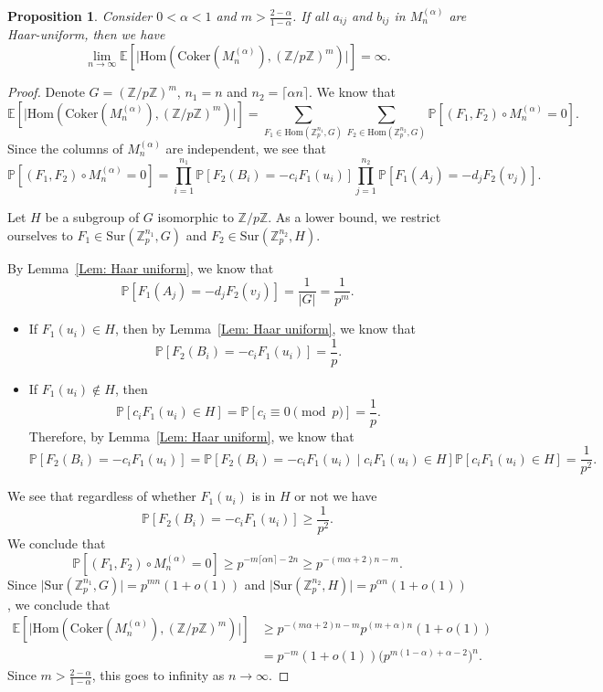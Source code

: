 \documentclass[12pt]{amsart}
\newtheorem{proposition}[theorem]{Proposition}
\theoremstyle{definition}
\newcommand{\PPP}{\mathbb{P}}
\newcommand{\Mna}{M_{n}^{(\alpha)}}
\newcommand{\abs}[1]{\vert#1\vert}
\newcommand{\Zp}{\Z_p}
\newcommand{\E}{\mathbb{E}}
\newcommand{\Z}{\mathbb{Z}}
\newcommand{\Coker}{\text{Coker}}
\newcommand{\Hom}{\text{Hom}}
\newcommand{\Sur}{\text{Sur}}
\newcommand{\ceil}[1]{\lceil#1\rceil}
\begin{document}
\begin{proposition}
Consider $0<\alpha<1$ and $m>\frac{2-\alpha}{1-\alpha}$.
If all $a_{ij}$ and $b_{ij}$ in $\Mna$ are Haar-uniform, then we have
\[
\lim_{n\to\infty} 
\E[\abs{\Hom(\Coker(\Mna),(\Z/p\Z)^m)}]
=\infty.
\]
\end{proposition}
\begin{proof}
Denote $G=(\Z/p\Z)^m$, $n_1=n$ and $n_2=\ceil{\alpha n}$. We know that
\[
\E[\abs{\Hom(\Coker(\Mna),(\Z/p\Z)^m)}]
=\sum_{F_1\in\Hom(\Zp^{n_1},G)}
\sum_{F_2\in\Hom(\Zp^{n_2},G)}
\PPP[(F_1,F_2)\circ \Mna =0].
\]
Since the columns of $\Mna$ are independent, we see that
\[
\PPP[(F_1,F_2)\circ \Mna =0]
=\prod_{i=1}^{n_1} \PPP[F_2(B_i)=-c_iF_1(u_i)]
\prod_{j=1}^{n_2} \PPP[F_1(A_j)=-d_jF_2(v_j)].
\]

Let $H$ be a subgroup of $G$ isomorphic to $\Z/p\Z$. As a lower bound, we restrict ourselves to $F_1\in\Sur(\Zp^{n_1},G)$ and $F_2\in \Sur(\Zp^{n_2},H)$.

By Lemma~\ref{Lem: Haar uniform}, we know that
    \[
    \PPP[F_1(A_j)=-d_jF_2(v_j)]
    =\frac{1}{\abs{G}}=\frac{1}{p^m}.
    \]
\begin{itemize}
    \item If $F_1(u_i)\in H$, then by Lemma~\ref{Lem: Haar uniform}, we know that
    \[
    \PPP[F_2(B_i)=-c_iF_1(u_i)]
    =\frac{1}{p}.
    \]
    \item If $F_1(u_i)\notin H$, then 
    \[
    \PPP[c_i F_1(u_i)\in H]
    =\PPP[c_i \equiv0\pmod{p}]
    =\frac{1}{p}.
    \]
    Therefore, by Lemma~\ref{Lem: Haar uniform}, we know that
    \[
    \PPP[F_2(B_i)=-c_iF_1(u_i)]
    =\PPP[F_2(B_i)=-c_iF_1(u_i)\mid c_iF_1(u_i)\in H] \PPP[c_iF_1(u_i)\in H]
    =\frac{1}{p^2}.
    \]
\end{itemize}
We see that regardless of whether $F_1(u_i)$ is in $H$ or not we have
\[
\PPP[F_2(B_i)=-c_iF_1(u_i)]
\geq \frac{1}{p^2}.
\]
We conclude that
\[
\PPP[(F_1,F_2)\circ \Mna =0]
\geq p^{-m \ceil{\alpha n} -2 n}
\geq p^{- (m\alpha+2)n -m}.
\]
Since $\abs{\Sur(\Zp^{n_1},G)} =p^{mn}(1+o(1))$ and $\abs{\Sur(\Zp^{n_2},H)} =p^{\alpha n}(1+o(1))$, we conclude that
\begin{align*}
\E[\abs{\Hom(\Coker(\Mna),(\Z/p\Z)^m)}]
&\geq p^{- (m\alpha+2)n -m} p^{(m+\alpha)n} (1+o(1))\\
&= p^{-m} (1+o(1)) \big(p^{m(1-\alpha)+\alpha-2} \big)^n.
\end{align*}
Since $m>\frac{2-\alpha}{1-\alpha}$, this goes to infinity as $n\to\infty$.
\end{proof}
\end{document}
